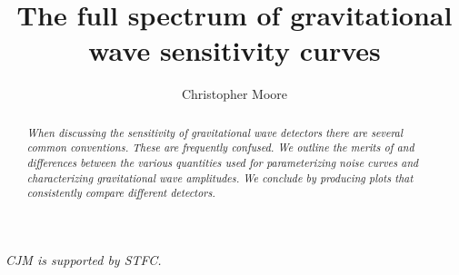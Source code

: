\documentclass[12pt]{iopart}
\begin{document}
\title{The full spectrum of gravitational wave sensitivity curves}
\author{Christopher Moore}
\address{Institute of Astronomy, University of Cambridge, Madingley Road, Cambridge, CB3 0HA}


\begin{abstract}
\emph{When discussing the sensitivity of gravitational wave detectors there are several common conventions. These are frequently confused. We outline the merits of and differences between the various quantities used for parameterizing noise curves and characterizing gravitational wave amplitudes. We conclude by producing plots that consistently compare different detectors.}
\end{abstract}





\ack{}
\emph{CJM is supported by STFC.}





%
\end{document}
